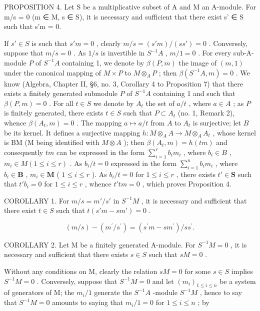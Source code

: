 PROPOSITION 4. Let S be a multiplicative subset of A and M an A-module. For m/s = 0 (m ∈ M, s ∈ S), it is necessary and sufficient that there exist s' ∈ S such that s'm = 0.

If \(s' \in S\) is such that \(s'm = 0\) , clearly \(m/s = (s'm)/(ss') = 0\) . Conversely, suppose that \(m/s = 0\) . As \(1/s\) is invertible in \(S^{-1}A\) , \(m/1 = 0\) . For every sub-A-module \(P\) of \(S^{-1}A\) containing 1, we denote by \(\beta(P, m)\) the image of \((m, 1)\) under the canonical mapping of \(M \times P\) to \(M \otimes_A P\) ; then \(\beta(S^{-1}A, m) = 0\) . We know (Algebra, Chapter II, §6, no. 3, Corollary 4 to Proposition 7) that there exists a finitely generated submodule \(P\) of \(S^{-1}A\) containing 1 and such that \(\beta(P, m) = 0\) . For all \(t \in S\) we denote by \(A_t\) the set of \(a/t\) , where \(a \in A\) ; as \(P\) is finitely generated, there exists \(t \in S\) such that \(P \subset A_t\) (no. 1, Remark 2), whence \(\beta(A_t, m) = 0\) . The mapping \(a \mapsto a/t\) from \(A\) to \(A_t\) is surjective; let \(B\) be its kernel. It defines a surjective mapping \(h: M \otimes_A A \to M \otimes_A A_t\) , whose kernel is BM (M being identified with \(M \otimes A\) ); then \(\beta(A_t, m) = h(tm)\) and consequently \(tm\) can be expressed in the form \(\sum_{i=1}^{r} b_i m_i\) , where \(b_i \in B\) , \(m_i \in M (1 \leqslant i \leqslant r)\) . As \(b_i/t = 0\) expressed in the form \(\sum_{i=1}^{n} b_i m_i\) , where \(b_i \in \mathbf{B}\) , \(m_i \in \mathbf{M}\) ( \(1 \leqslant i \leqslant r\) ). As \(b_i / t = 0\) for \(1 \leqslant i \leqslant r\) , there exists \(t' \in \mathbf{S}\) such that \(t'b_i = 0\) for \(1 \leqslant i \leqslant r\) , whence \(t'tm = 0\) , which proves Proposition 4.

COROLLARY 1. For \(m / s = m' / s'\) in \(S^{-1}M\) , it is necessary and sufficient that there exist \(t \in S\) such that \(t(s'm - sm') = 0\) .

\[
(m / s) - (m ^ {\prime} / s ^ {\prime}) = (s ^ {\prime} m - s m ^ {\prime}) / s s ^ {\prime}.
\]

COROLLARY 2. Let M be a finitely generated A-module. For \(S^{-1}M = 0\) , it is necessary and sufficient that there exists \(s \in S\) such that \(sM = 0\) .

Without any conditions on M, clearly the relation \(sM = 0\) for some \(s \in S\) implies \(S^{-1}M = 0\) . Conversely, suppose that \(S^{-1}M = 0\) and let \((m_i)_{1 \leqslant i \leqslant n}\) be a system of generators of M; the \(m_i / 1\) generate the \(S^{-1}A\) -module \(S^{-1}M\) , hence to say that \(S^{-1}M = 0\) amounts to saying that \(m_i / 1 = 0\) for \(1 \leqslant i \leqslant n\) ; by

